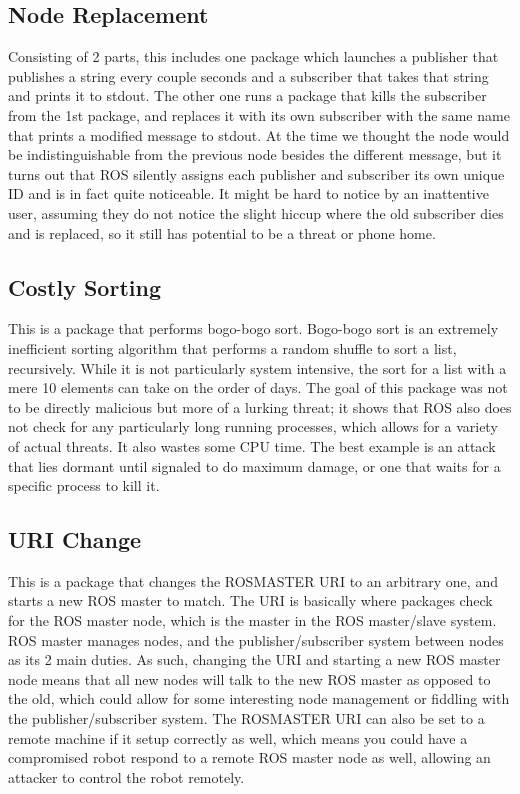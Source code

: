\documentclass[IEEEtran,letterpaper,10pt,notitlepage,draftclsnofoot]{article}
\begin{document}
\subsection{Node Replacement}
Consisting of 2 parts, this includes one package which launches a publisher that publishes a string every couple seconds and a
subscriber that takes that string and prints it to stdout.
The other one runs a package that kills the subscriber from the 1st package, and replaces it with its own subscriber with the
same name that prints a modified message to stdout.
At the time we thought the node would be indistinguishable from the previous node besides the different message, but it turns
out that ROS silently assigns each publisher and subscriber its own unique ID and is in fact quite noticeable.
It might be hard to notice by an inattentive user, assuming they do not notice the slight hiccup where the old subscriber dies
and is replaced, so it still has potential to be a threat or phone home.

\subsection{Costly Sorting}
This is a package that performs bogo-bogo sort. \cite{bogo}
Bogo-bogo sort is an extremely inefficient sorting algorithm that performs a random shuffle to sort a list, recursively.
While it is not particularly system intensive, the sort for a list with a mere 10 elements can take on the order of days.
The goal of this package was not to be directly malicious but more of a lurking threat; it shows that ROS also does not check
for any particularly long running processes, which allows for a variety of actual threats. It also wastes some CPU time.
The best example is an attack that lies dormant until signaled to do maximum damage, or one that waits for a specific process
to kill it.

\subsection{URI Change}
This is a package that changes the ROSMASTER URI to an arbitrary one, and starts a new ROS master to match.
The URI is basically where packages check for the ROS master node, which is the master in the ROS master/slave system.
ROS master manages nodes, and the publisher/subscriber system between nodes as its 2 main duties.
As such, changing the URI and starting a new ROS master node means that all new nodes will talk to the new ROS master as
opposed to the old, which could allow for some interesting node management or fiddling with the publisher/subscriber system.
The ROSMASTER URI can also be set to a remote machine if it setup correctly as well, which means you could have a compromised
robot respond to a remote ROS master node as well, allowing an attacker to control the robot remotely.
\end{document}
